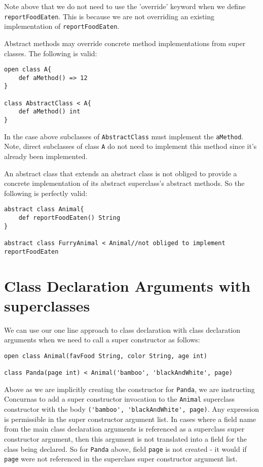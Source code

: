 \documentclass[conc-doc]{subfiles}
\begin{document}
Note above that we do not need to use the 'override' keyword when we define \lstinline{reportFoodEaten}. This is because we are not overriding an existing implementation of \lstinline{reportFoodEaten}.

Abstract methods may override concrete method implementations from super classes. The following is valid:

\begin{lstlisting}
open class A{
	def aMethod() => 12
}

class AbstractClass < A{
	def aMethod() int
}
\end{lstlisting}

In the case above subclasses of \lstinline{AbstractClass} must implement the \lstinline{aMethod}. Note, direct subclasses of class \lstinline{A} do not need to implement this method since it's already been implemented.

An abstract class that extends an abstract class is not obliged to provide a concrete implementation of its abstract superclass's abstract methods. So the following is perfectly valid:

\begin{lstlisting}
abstract class Animal{
	def reportFoodEaten() String
}

abstract class FurryAnimal < Animal//not obliged to implement reportFoodEaten
\end{lstlisting}

\section{Class Declaration Arguments with superclasses}
We can use our one line approach to class declaration with class declaration arguments when we need to call a super constructor as follows:

\begin{lstlisting}
open class Animal(favFood String, color String, age int)

class Panda(page int) < Animal('bamboo', 'blackAndWhite', page)
\end{lstlisting}

Above as we are implicitly creating the constructor for \lstinline{Panda}, we are instructing Concurnas to add a super constructor invocation to the \lstinline{Animal} superclass constructor with the body \lstinline{('bamboo', 'blackAndWhite', page)}. Any expression is permissible in the super constructor argument list. In cases where a field name from the main class declaration arguments is referenced as a superclass super constructor argument, then this argument is not translated into a field for the class being declared. So for \lstinline{Panda} above, field \lstinline{page} is not created - it would if \lstinline{page} were not referenced in the superclass super constructor argument list.
\end{document}
